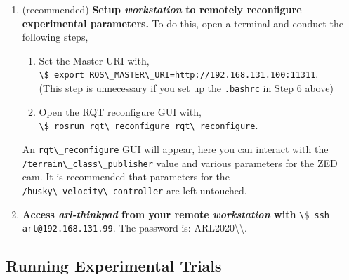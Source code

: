 \documentclass[
	12pt, %
]{fphw}
\newcommand{\code}[1]{\colorbox{light-gray}{\lstinline|#1|}}
\begin{document}
\begin{enumerate}
\item (recommended) \textbf{Setup \emph{workstation} to remotely reconfigure experimental parameters.} To do this, open a terminal and conduct the following steps,

\begin{enumerate}
	\item Set the Master URI with, \\ \code{\$ export ROS\_MASTER\_URI=http://192.168.131.100:11311}. \\ (This step is unnecessary if you set up the \code{.bashrc} in Step 6 above)
	\item Open the RQT reconfigure GUI with, \\ \code{\$ rosrun rqt\_reconfigure rqt\_reconfigure}.
\end{enumerate}

An \code{rqt\_reconfigure} GUI will appear, here you can interact with the \\ \code{/terrain\_class\_publisher} value and various parameters for the ZED cam. It is recommended that parameters for the \code{/husky\_velocity\_controller} are left untouched.

\item \textbf{Access \emph{arl-thinkpad} from your remote \emph{workstation} with} \code{\$ ssh arl@192.168.131.99}. The password is: ARL2020\textbackslash\textbackslash.

\end{enumerate}

\subsection{Running Experimental Trials}
\end{document}
